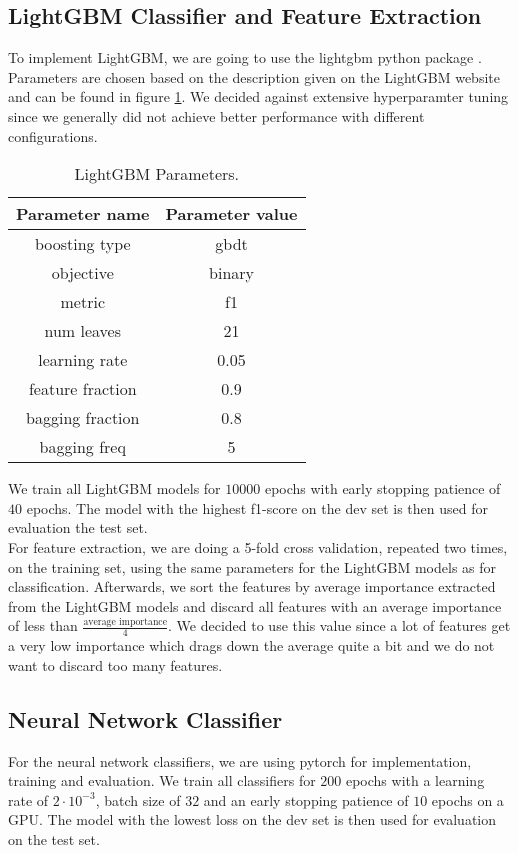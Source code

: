 \subsection{LightGBM Classifier and Feature Extraction}
To implement LightGBM, we are going to use the lightgbm python package \cite{lgbmpython}. Parameters are chosen based on the description given on the LightGBM website \cite{lgbmpython} and can be found in figure \ref{fig:lgbmparams}. We decided against extensive hyperparamter tuning since we generally did not achieve better performance with different configurations.

\begin{table}[H]
  \begin{center}
   	\begin{tabular}{|| c | c ||}
   	\hline
   	Parameter name & Parameter value \\
   	\hline\hline
   	boosting type & gbdt \\
 	\hline
 	objective & binary \\
 	\hline
 	metric & f1 \\
 	\hline
 	num leaves & 21 \\
 	\hline
 	learning rate & 0.05 \\
 	\hline
 	feature fraction & 0.9 \\
 	\hline
 	bagging fraction & 0.8 \\
 	\hline
 	bagging freq & 5 \\
 	\hline
	\end{tabular}
  \end{center}
  \caption{LightGBM Parameters.}%
  \label{fig:lgbmparams}
\end{table}

We train all LightGBM models for $10000$ epochs with early stopping patience of $40$ epochs. The model with the highest f1-score on the dev set is then used for evaluation the test set. \\
For feature extraction, we are doing a 5-fold cross validation, repeated two times, on the training set, using the same parameters for the LightGBM models as for classification. Afterwards, we sort the features by average importance extracted from the LightGBM models and discard all features with an average importance of less than $\frac{\text{average importance}}{4}$. We decided to use this value since a lot of features get a very low importance which drags down the average quite a bit and we do not want to discard too many features.


\subsection{Neural Network Classifier}
For the neural network classifiers, we are using pytorch \cite{pytorch} for implementation, training and evaluation. We train all classifiers for $200$ epochs with a learning rate of $2 \cdot 10^{-3}$, batch size of $32$ and an early stopping patience of $10$ epochs on a GPU. The model with the lowest loss on the dev set is then used for evaluation on the test set.

